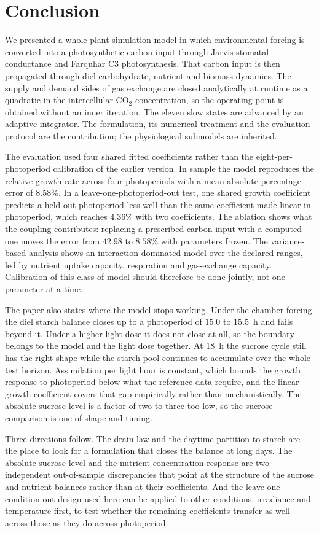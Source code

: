 \section{Conclusion}
\label{sec:conclusion}

We presented a whole-plant simulation model in which environmental forcing is
converted into a photosynthetic carbon input through Jarvis stomatal conductance
and Farquhar C3 photosynthesis. That carbon input is then propagated through
diel carbohydrate, nutrient and biomass dynamics. The supply and demand
sides of gas exchange are closed analytically at runtime as a quadratic in the
intercellular CO$_2$ concentration, so the operating point is obtained without
an inner iteration. The eleven slow states are advanced by an adaptive
integrator. The formulation, its numerical treatment and the evaluation
protocol are the contribution; the physiological submodels are inherited.

The evaluation used four shared fitted coefficients rather than the
eight-per-photoperiod calibration of the earlier version. In sample the model
reproduces the relative growth rate across four photoperiods with a mean
absolute percentage error of $8.58\%$. In a leave-one-photoperiod-out test, one
shared growth coefficient predicts a held-out photoperiod less well than the
same coefficient made linear in photoperiod, which reaches $4.36\%$ with two
coefficients. The ablation shows what the coupling contributes: replacing a
prescribed carbon input with a computed one moves the error from $42.98$ to
$8.58\%$ with parameters frozen. The variance-based analysis shows an
interaction-dominated model over the declared ranges, led by nutrient uptake
capacity, respiration and gas-exchange capacity. Calibration of this class of
model should therefore be done jointly, not one parameter at a time.

The paper also states where the model stops working. Under the chamber forcing the diel
starch balance closes up to a photoperiod of $15.0$ to $15.5$~h and fails
beyond it. Under a higher light dose it does not close at all, so the boundary
belongs to the model and the light dose together. At 18~h the sucrose
cycle still has the right shape while the starch pool continues to accumulate
over the whole test horizon. Assimilation per light hour is constant, which bounds the growth
response to photoperiod below what the reference data require, and the linear
growth coefficient covers that gap empirically rather than mechanistically. The
absolute sucrose level is a factor of two to three too low, so the sucrose
comparison is one of shape and timing.

Three directions follow. The drain law and the daytime partition to starch are
the place to look for a formulation that closes the balance at long days.
The absolute sucrose level and the nutrient concentration response are two
independent out-of-sample discrepancies that point at the structure of the
sucrose and nutrient balances rather than at their coefficients. And the
leave-one-condition-out design used here can be applied to other conditions,
irradiance and temperature first, to test whether the remaining coefficients
transfer as well across those as they do across photoperiod.

